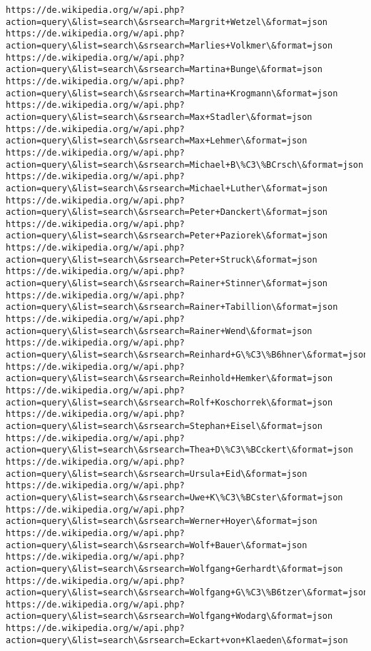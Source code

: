 \documentclass[11pt]{article}
\begin{document}
\begin{Verbatim}[commandchars=\\\{\}]
https://de.wikipedia.org/w/api.php?action=query\&list=search\&srsearch=Margrit+Wetzel\&format=json
https://de.wikipedia.org/w/api.php?action=query\&list=search\&srsearch=Marlies+Volkmer\&format=json
https://de.wikipedia.org/w/api.php?action=query\&list=search\&srsearch=Martina+Bunge\&format=json
https://de.wikipedia.org/w/api.php?action=query\&list=search\&srsearch=Martina+Krogmann\&format=json
https://de.wikipedia.org/w/api.php?action=query\&list=search\&srsearch=Max+Stadler\&format=json
https://de.wikipedia.org/w/api.php?action=query\&list=search\&srsearch=Max+Lehmer\&format=json
https://de.wikipedia.org/w/api.php?action=query\&list=search\&srsearch=Michael+B\%C3\%BCrsch\&format=json
https://de.wikipedia.org/w/api.php?action=query\&list=search\&srsearch=Michael+Luther\&format=json
https://de.wikipedia.org/w/api.php?action=query\&list=search\&srsearch=Peter+Danckert\&format=json
https://de.wikipedia.org/w/api.php?action=query\&list=search\&srsearch=Peter+Paziorek\&format=json
https://de.wikipedia.org/w/api.php?action=query\&list=search\&srsearch=Peter+Struck\&format=json
https://de.wikipedia.org/w/api.php?action=query\&list=search\&srsearch=Rainer+Stinner\&format=json
https://de.wikipedia.org/w/api.php?action=query\&list=search\&srsearch=Rainer+Tabillion\&format=json
https://de.wikipedia.org/w/api.php?action=query\&list=search\&srsearch=Rainer+Wend\&format=json
https://de.wikipedia.org/w/api.php?action=query\&list=search\&srsearch=Reinhard+G\%C3\%B6hner\&format=json
https://de.wikipedia.org/w/api.php?action=query\&list=search\&srsearch=Reinhold+Hemker\&format=json
https://de.wikipedia.org/w/api.php?action=query\&list=search\&srsearch=Rolf+Koschorrek\&format=json
https://de.wikipedia.org/w/api.php?action=query\&list=search\&srsearch=Stephan+Eisel\&format=json
https://de.wikipedia.org/w/api.php?action=query\&list=search\&srsearch=Thea+D\%C3\%BCckert\&format=json
https://de.wikipedia.org/w/api.php?action=query\&list=search\&srsearch=Ursula+Eid\&format=json
https://de.wikipedia.org/w/api.php?action=query\&list=search\&srsearch=Uwe+K\%C3\%BCster\&format=json
https://de.wikipedia.org/w/api.php?action=query\&list=search\&srsearch=Werner+Hoyer\&format=json
https://de.wikipedia.org/w/api.php?action=query\&list=search\&srsearch=Wolf+Bauer\&format=json
https://de.wikipedia.org/w/api.php?action=query\&list=search\&srsearch=Wolfgang+Gerhardt\&format=json
https://de.wikipedia.org/w/api.php?action=query\&list=search\&srsearch=Wolfgang+G\%C3\%B6tzer\&format=json
https://de.wikipedia.org/w/api.php?action=query\&list=search\&srsearch=Wolfgang+Wodarg\&format=json
https://de.wikipedia.org/w/api.php?action=query\&list=search\&srsearch=Eckart+von+Klaeden\&format=json

\end{Verbatim}
\end{document}
